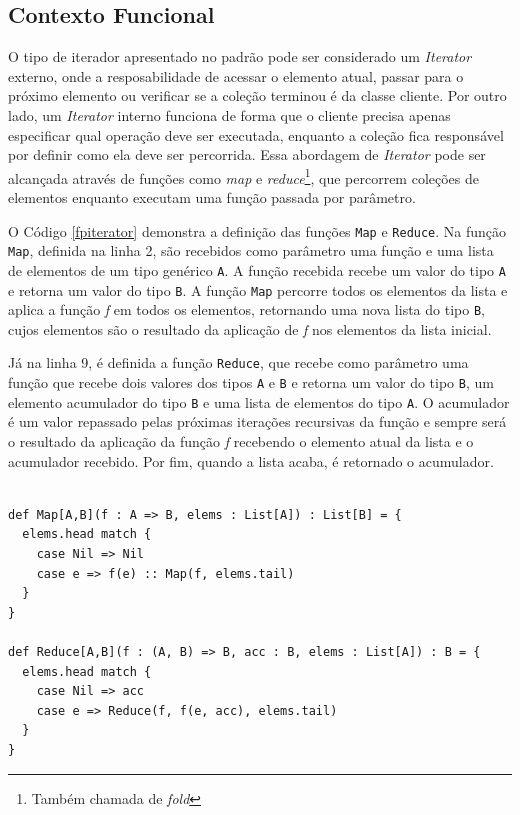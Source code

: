 \subsection*{Contexto Funcional}

O tipo de iterador apresentado no padrão pode 
ser considerado um \textit{Iterator} externo, onde a 
resposabilidade de acessar o elemento atual, 
passar para o próximo elemento ou verificar se 
a coleção terminou é da classe cliente. Por 
outro lado, um \textit{Iterator} interno funciona de forma 
que o cliente precisa apenas especificar qual 
operação deve ser executada, enquanto a 
coleção fica responsável por definir como ela 
deve ser percorrida. Essa abordagem de \textit{Iterator} 
pode ser alcançada através de funções como  
\textit{map} e \textit{reduce}\footnote{Também 
chamada de \textit{fold}}, que percorrem coleções 
de elementos enquanto executam uma função 
passada por parâmetro.\cite{iteratoressence}

O Código \ref{fpiterator} demonstra a definição 
das funções \texttt{Map} e \texttt{Reduce}. 
Na função \texttt{Map}, definida 
na linha 2, são recebidos como parâmetro uma 
função e uma lista de elementos de um tipo 
genérico \texttt{A}. A função recebida recebe um valor 
do tipo \texttt{A} e retorna um valor do tipo \texttt{B}. A função 
\texttt{Map} percorre todos os elementos da lista e 
aplica a função \textit{f} em todos os elementos, 
retornando uma nova lista do tipo \texttt{B}, cujos 
elementos são o resultado da aplicação de \textit{f} nos 
elementos da lista inicial.

Já na linha 9, é definida a função \texttt{Reduce}, que 
recebe como parâmetro uma função que recebe dois 
valores dos tipos \texttt{A} e \texttt{B} e retorna um valor do 
tipo \texttt{B}, um elemento acumulador do tipo \texttt{B} e uma 
lista de elementos do tipo \texttt{A}. O acumulador 
é um valor repassado pelas próximas iterações 
recursivas da função e sempre será o resultado 
da aplicação da função \textit{f} recebendo o elemento 
atual da lista e o acumulador recebido. 
Por fim, quando a lista acaba, é retornado o 
acumulador. 

\begin{lstlisting}[caption={Exemplos de \textit{Iterator}: \texttt{Map} e \texttt{Reduce}.},label=fpiterator]
    
def Map[A,B](f : A => B, elems : List[A]) : List[B] = {
  elems.head match {
    case Nil => Nil
    case e => f(e) :: Map(f, elems.tail)
  }
}

def Reduce[A,B](f : (A, B) => B, acc : B, elems : List[A]) : B = {
  elems.head match {
    case Nil => acc
    case e => Reduce(f, f(e, acc), elems.tail)
  }
}

\end{lstlisting}

